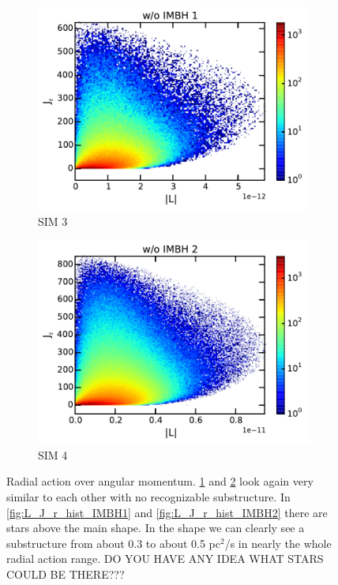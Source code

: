 \begin{figure}[htbp]
\begin{subfigure}{0.475\textwidth}
		\includegraphics[width=\textwidth]{Plots/L_J_r_hist_noIMBH1.pdf}
		\caption{SIM 3}
		\label{fig:L_J_r_hist_noIMBH1}
	\end{subfigure}
	\hfill
	\begin{subfigure}{0.475\textwidth}
		\includegraphics[width=\textwidth]{Plots/L_J_r_hist_noIMBH2.pdf}
		\caption{SIM 4}
		\label{fig:L_J_r_hist_noIMBH2}
	\end{subfigure}
	\caption{Radial action over angular momentum. \ref{fig:L_J_r_hist_noIMBH1} and \ref{fig:L_J_r_hist_noIMBH2} look again very similar to each other with no recognizable substructure. In \ref{fig:L_J_r_hist_IMBH1} and \ref{fig:L_J_r_hist_IMBH2} there are stars above the main shape. In the shape we can clearly see a substructure from about 0.3 to about 0.5 pc\(^2\)/s in nearly the whole radial action range. \color{red} DO YOU HAVE ANY IDEA WHAT STARS COULD BE THERE??? \color{black}}
	\label{fig:L_J_r_hist}
\end{figure}
